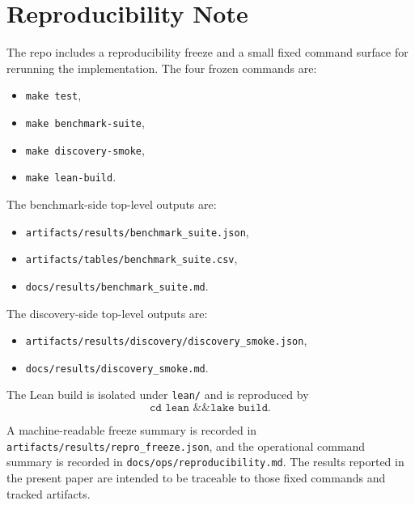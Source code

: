 \documentclass[11pt]{article}
\theoremstyle{definition}
\begin{document}
\section{Reproducibility Note}\label{app:reproducibility}
The repo includes a reproducibility freeze and a small fixed command surface for rerunning the implementation. The four frozen commands are:
\begin{itemize}
\item \texttt{make test},
\item \texttt{make benchmark-suite},
\item \texttt{make discovery-smoke},
\item \texttt{make lean-build}.
\end{itemize}
The benchmark-side top-level outputs are:
\begin{itemize}
\item \nolinkurl{artifacts/results/benchmark_suite.json},
\item \nolinkurl{artifacts/tables/benchmark_suite.csv},
\item \nolinkurl{docs/results/benchmark_suite.md}.
\end{itemize}
The discovery-side top-level outputs are:
\begin{itemize}
\item \nolinkurl{artifacts/results/discovery/discovery_smoke.json},
\item \nolinkurl{docs/results/discovery_smoke.md}.
\end{itemize}
The Lean build is isolated under \texttt{lean/} and is reproduced by
\[
\texttt{cd lean \&\& lake build}.
\]

A machine-readable freeze summary is recorded in
\nolinkurl{artifacts/results/repro_freeze.json}, and the operational command summary is recorded in
\texttt{docs/ops/reproducibility.md}. The results reported in the present paper are intended to be traceable to those fixed commands and tracked artifacts.



\end{document}
